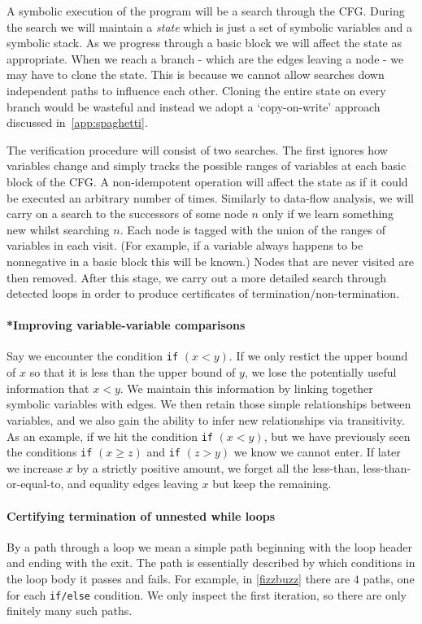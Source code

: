 \documentclass[12pt,a4paper]{article}
\begin{document}
\begin{enumerate}
A symbolic execution of the program will be a search through the CFG. During the search we will maintain a \textit{state} which is just a set of symbolic variables and a symbolic stack. As we progress through a basic block we will affect the state as appropriate. 
When we reach a branch - which are the edges leaving a node - we may have to clone the state. This is because we cannot allow searches down independent paths to influence each other. Cloning the entire state on every branch would be wasteful and instead we adopt a `copy-on-write' approach discussed in~\cref{app:spaghetti}.

The verification procedure will consist of two searches. The first ignores how variables change and simply tracks the possible ranges of variables at each basic block of the CFG. A non-idempotent operation will affect the state as if it could be executed an arbitrary number of times. Similarly to data-flow analysis, we will carry on a search to the successors of some node $n$ only if we learn something new whilst searching $n$. Each node is tagged with the union of the ranges of variables in each visit. (For example, if a variable always happens to be nonnegative in a basic block this will be known.) Nodes that are never visited are then removed. After this stage, we carry out a more detailed
search through detected loops in order to produce certificates of termination/non-termination.

\paragraph{*Improving variable-variable comparisons}
Say we encounter the condition \texttt{if} $(x < y)$. If we only restict the upper bound of $x$ so that it is less than the upper bound of $y$, we lose the potentially useful information that $x < y$.
We maintain this information by linking together symbolic variables with edges. We then retain those simple relationships between variables, and we also gain the ability to infer new relationships via transitivity.
As an example, if we hit the condition \texttt{if} $(x < y)$, but we have previously seen the conditions \texttt{if} $(x \geq z)$ and \texttt{if} $(z > y)$ we know we cannot enter.
If later we increase $x$ by a strictly positive amount, we forget all the less-than, less-than-or-equal-to, and equality edges leaving $x$ but keep the remaining.

\paragraph{Certifying termination of unnested while loops}\label{par:loops}
By a path through a loop we mean a simple path beginning with the loop header and ending with the exit. The path is essentially described by which conditions
in the loop body it passes and fails. For example, in \cref{fizzbuzz} there are $4$ paths, one for each \texttt{if/else} condition. We only inspect the first iteration, so there are only finitely many such paths.


\end{enumerate}
\end{document}
